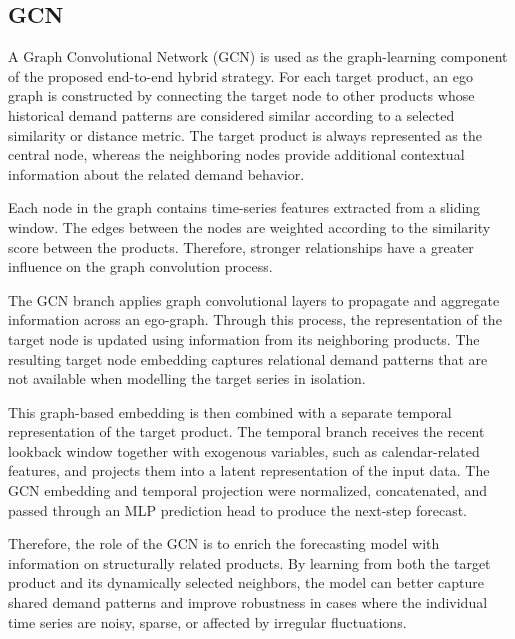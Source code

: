 \subsection{GCN}

A Graph Convolutional Network (GCN) is used as the graph-learning component of the proposed end-to-end hybrid strategy. For each target product, an ego graph is constructed by connecting the target node to other products whose historical demand patterns are considered similar according to a selected similarity or distance metric. The target product is always represented as the central node, whereas the neighboring nodes provide additional contextual information about the related demand behavior.

Each node in the graph contains time-series features extracted from a sliding window. The edges between the nodes are weighted according to the similarity score between the products. Therefore, stronger relationships have a greater influence on the graph convolution process.

The GCN branch applies graph convolutional layers to propagate and aggregate information across an ego-graph. Through this process, the representation of the target node is updated using information from its neighboring products. The resulting target node embedding captures relational demand patterns that are not available when modelling the target series in isolation.

This graph-based embedding is then combined with a separate temporal representation of the target product. The temporal branch receives the recent lookback window together with exogenous variables, such as calendar-related features, and projects them into a latent representation of the input data. The GCN embedding and temporal projection were normalized, concatenated, and passed through an MLP prediction head to produce the next-step forecast.

Therefore, the role of the GCN is to enrich the forecasting model with information on structurally related products. By learning from both the target product and its dynamically selected neighbors, the model can better capture shared demand patterns and improve robustness in cases where the individual time series are noisy, sparse, or affected by irregular fluctuations.


